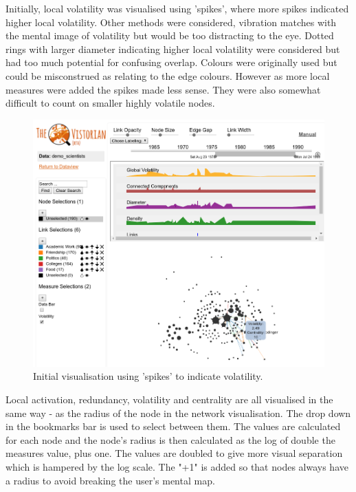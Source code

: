 Initially, local volatility was visualised using 'spikes', where more spikes indicated higher local volatility. Other methods were considered, vibration matches with the mental image of volatility but would be too distracting to the eye. Dotted rings with larger diameter indicating higher local volatility were considered but had too much potential for confusing overlap. Colours were originally used but could be misconstrued as relating to the edge colours. 
However as more local measures were added the spikes made less sense. They were also somewhat difficult to count on smaller highly volatile nodes.


\begin{figure}[h!]
  \begin{center}
  \includegraphics[trim={9cm, 0, 0, 14cm}, clip, width=140mm]{./Figures/finalUI.png}
  \caption{Initial visualisation using 'spikes' to indicate volatility.}
  \label{fig:greyCircles}
  \end{center}
\end{figure}


Local activation, redundancy, volatility and centrality are all visualised in the same way - as the radius of the node in the network visualisation. The drop down in the bookmarks bar is used to select between them. The values are calculated for each node and the node's radius is then calculated as the log of double the measures value, plus one. The values are doubled to give more visual separation which is hampered by the log scale. The "+1" is added so that nodes always have a radius to avoid breaking the user's mental map.

